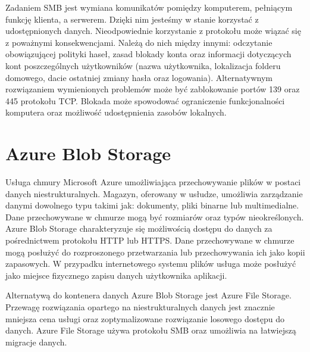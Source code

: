  Zadaniem SMB jest wymiana komunikatów pomiędzy komputerem, pełniącym funkcję klienta, a serwerem. Dzięki nim jesteśmy w stanie korzystać z udostępnionych danych. Nieodpowiednie korzystanie z protokołu może wiązać się z poważnymi konsekwencjami. Należą do nich między innymi: odczytanie obowiązującej polityki haseł, zasad blokady konta oraz informacji dotyczących kont poszczególnych użytkowników (nazwa użytkownika, lokalizacja folderu domowego, dacie ostatniej zmiany hasła oraz logowania). Alternatywnym rozwiązaniem wymienionych problemów może być zablokowanie portów 139 oraz 445 protokołu TCP. Blokada może spowodować ograniczenie funkcjonalności komputera oraz możliwość udostępnienia zasobów lokalnych.

\section{Azure Blob Storage}
Usługa chmury Microsoft Azure\cite{BlobAzureTutorial:limitation} umożliwiająca przechowywanie plików w postaci danych niestrukturalnych. Magazyn, oferowany w usłudze, umożliwia zarządzanie danymi dowolnego typu takimi jak: dokumenty, pliki binarne lub multimedialne. Dane przechowywane w chmurze mogą być rozmiarów oraz typów nieokreślonych. Azure Blob Storage\cite{MicrosoftAzureBlobStorage} charakteryzuje się możliwością dostępu do danych za pośrednictwem protokołu HTTP lub HTTPS. Dane przechowywane w chmurze mogą posłużyć do rozproszonego przetwarzania lub przechowywania ich jako kopii zapasowych. W przypadku internetowego systemu plików usługa może posłużyć jako miejsce fizycznego zapisu danych użytkownika aplikacji. 

Alternatywą do kontenera danych Azure Blob Storage jest Azure File Storage\cite{MicrosoftAzureFileStorage}. Przewagę rozwiązania opartego na niestrukturalnych danych jest znacznie mniejsza cena usługi oraz zoptymalizowane rozwiązanie losowego dostępu do danych. Azure File Storage używa protokołu SMB oraz umożliwia na łatwiejszą migracje danych.